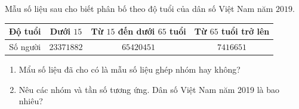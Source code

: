 \begin{bt}%

Mẫu số liệu sau cho biết phân bố theo độ tuổi của dân số Việt Nam năm $2019$.
\begin{center}
    \begin{tabular}{|c|c|c|c|}
        \hline
Độ tuổi&Dưới $15$&Từ $15$ đến dưới $65$ tuổi&Từ $65$ tuổi trở lên\\
\hline
Số người&$23371882$&$65420451$&$7416651$\\
\hline
    \end{tabular}
\end{center}
\begin{enumerate}
    \item Mẩu số liệu đã cho có là mẫu số liệu ghép nhóm hay không?
\item Nêu các nhóm và tần số tương ứng. Dân số Việt Nam năm 2019 là bao nhiêu?
\end{enumerate}
\end{bt}

